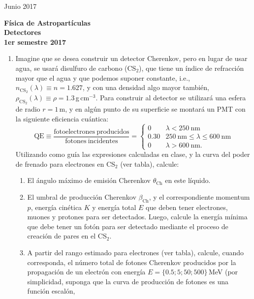 \documentclass[11pt]{article}
\begin{document}
\pagestyle{empty}
{Junio 2017}
\begin{center}
	{\Large \bf Física de Astropartículas} \\
{ \large \bf Detectores} \\ {\bf 1er semestre 2017}
\end{center}

\setcounter{enumi}{0}      %
\begin{enumerate}
	\item Imagine que se desea construir un detector Cherenkov, pero en lugar
		de usar agua, se usará disulfuro de carbono (CS$_2$), que tiene un
		índice de refracción mayor que el agua y que podemos suponer constante,
		i.e., $n_{\mathrm{CS}_2}(\lambda) \equiv n = 1.627$, y con una densidad
		algo mayor también, $\rho_{\mathrm{CS}_2}(\lambda) \equiv \rho =
		1.3$\,g\,cm$^{-3}$. Para construir al detector se utilizará una esfera
		de radio $r=1$\,m, y en algún punto de su superficie se montará un PMT
		con la siguiente eficiencia cuántica:
		$$
			\mathrm{QE} \equiv \frac{\mathrm{fotoelectrones\
			producidos}}{\mathrm{fotones\ incidentes}} = 
			\begin{cases}
				0    & \lambda < 250\mathrm{\ nm} \\
				0.30 & 250\mathrm{\ nm} \leq \lambda \leq 600\mathrm{\ nm} \\
				0    & \lambda > 600\mathrm{\ nm}.
			\end{cases}
		$$
		Utilizando como guía las expresiones calculadas en clase, y la curva
		del poder de frenado para electrones en CS$_2$ (ver tabla), calcule:
		\begin{enumerate}
			\item El ángulo máximo de emisión Cherenkov $\theta_{\mathrm{Ch}}$
				en este líquido. 
			\item El umbral de producción Cherenkov $\beta_{\mathrm{Ch}}$, y el
				correspondiente momentum $p$, energía cinética $K$ y energía
				total $E$ que deben tener electrones, muones y protones para
				ser detectados.  Luego, calcule la energía mínima que debe
				tener un fotón para ser detectado mediante el proceso de
				creación de pares en el CS$_2$.
			\item A partir del rango estimado para electrones (ver tabla),
				calcule, cuando corresponda, el número total de fotones
				Cherenkov producidos por la propagación de un electrón con
				energía $E=\{0.5; 5; 50; 500\}$\,MeV (por simplicidad, suponga
				que la curva de producción de fotones es una función escalón,

\end{enumerate}
\end{enumerate}
\end{document}
